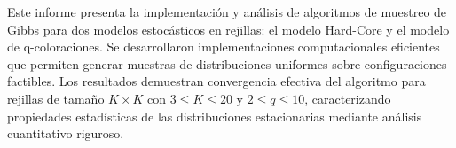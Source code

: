 \documentclass[
	spanish,
	letterpaper, oneside
]{article}
\begin{document}
\templatePortrait

\templatePagecfg

\begin{abstractd}
Este informe presenta la implementación y análisis de algoritmos de muestreo de Gibbs para dos modelos estocásticos en rejillas: el modelo Hard-Core y el modelo de q-coloraciones. Se desarrollaron implementaciones computacionales eficientes que permiten generar muestras de distribuciones uniformes sobre configuraciones factibles. Los resultados demuestran convergencia efectiva del algoritmo para rejillas de tamaño $K \times K$ con $3 \leq K \leq 20$ y $2 \leq q \leq 10$, caracterizando propiedades estadísticas de las distribuciones estacionarias mediante análisis cuantitativo riguroso.
\end{abstractd}

\templateIndex

\templateFinalcfg




\end{document}
